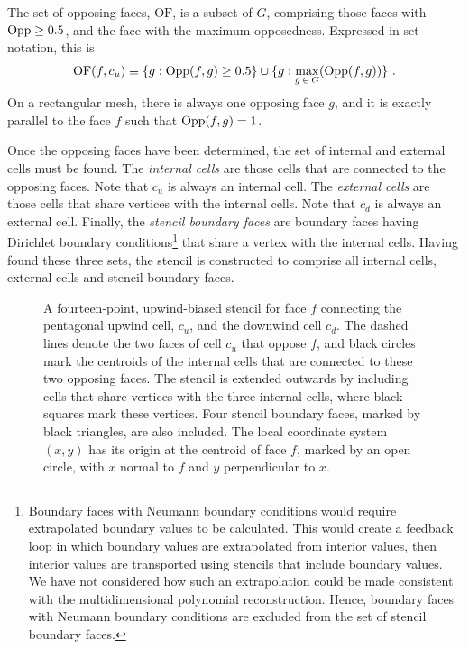 The set of opposing faces, $\mathrm{OF}$, is a subset of $G$, comprising those faces with $\mathrm{Opp} \geq 0.5$, and the face with the maximum opposedness.  Expressed in set notation, this is
\begin{align}
	\mathrm{OF}(f,c_u) \equiv \{ g : \mathrm{Opp}(f, g) \geq 0.5 \} \cup \{ g : \max_{g\:\in\:G}(\mathrm{Opp}(f, g)) \} \text{ .}
\end{align}
On a rectangular mesh, there is always one opposing face $g$, and it is exactly parallel to the face $f$ such that $\mathrm{Opp}(f, g) = 1$.

Once the opposing faces have been determined, the set of internal and external cells must be found.  The \textit{internal cells} are those cells that are connected to the opposing faces.  Note that $c_u$ is always an internal cell.  The \textit{external cells} are those cells that share vertices with the internal cells.  Note that $c_d$ is always an external cell.  Finally, the \textit{stencil boundary faces} are boundary faces having Dirichlet boundary conditions\footnote{Boundary faces with Neumann boundary conditions would require extrapolated boundary values to be calculated.
This would create a feedback loop in which boundary values are extrapolated from interior values, then interior values are transported using stencils that include boundary values.  
We have not considered how such an extrapolation could be made consistent with the multidimensional polynomial reconstruction.
Hence, boundary faces with Neumann boundary conditions are excluded from the set of stencil boundary faces.} that share a vertex with the internal cells.
Having found these three sets, the stencil is constructed to comprise all internal cells, external cells and stencil boundary faces.

\begin{figure}
	\centering
	
	\caption{A fourteen-point, upwind-biased stencil for face $f$ connecting the pentagonal upwind cell, $c_u$, and the downwind cell $c_d$.  The dashed lines denote the two faces of cell $c_u$ that oppose $f$, and black circles mark the centroids of the internal cells that are connected to these two opposing faces.  The stencil is extended outwards by including cells that share vertices with the three internal cells, where black squares mark these vertices.  Four stencil boundary faces, marked by black triangles, are also included.
The local coordinate system $(x, y)$ has its origin at the centroid of face $f$, marked by an open circle, with $x$ normal to $f$ and $y$ perpendicular to $x$.}
	\label{fig:double-upwind-stencil}
\end{figure}

